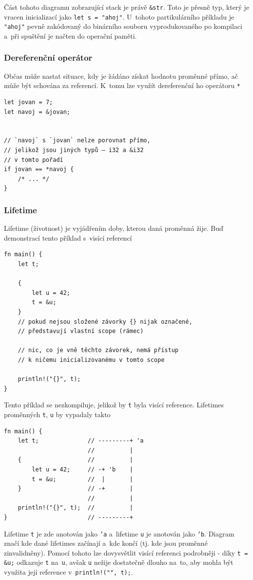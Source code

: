 \documentclass[a4paper, 12pt, twoside]{article} %
\newcommand{\rust}[1]{\texttt{#1}}
\begin{document}
				Část tohoto diagramu zobrazující stack je právě \rust{&str}. Toto je přesně typ, který je vracen inicializací jako \rust{let s = "ahoj"}. U~tohoto partikulárního příkladu je \rust{"ahoj"} pevně zakódovaný do binárního souboru vyprodukovaného po kompilaci a~při spuštění je načten do operační paměti.

			\subsubsection*{Dereferenční operátor}
				Občas může nastat situace, kdy je žádáno získat hodnotu proměnné přímo, ač může být schována za referencí. K~tomu lze využít dereferenční ho operátoru \rust{*}
				\begin{verbatim} 
let jovan = 7;
let navoj = &jovan;


// `navoj` s `jovan` nelze porovnat přímo,
// jelikož jsou jiných typů — i32 a &i32
// v tomto pořadí
if jovan == *navoj {
	/* ... */
}
				\end{verbatim}
		
			\subsubsection*{Lifetime}
				Lifetime (životnost) je vyjádřením doby, kterou daná proměnná žije. Buď demonstrací tento příklad s~visící referencí
				\begin{verbatim}
fn main() {
	let t;

	{
		let u = 42;
		t = &u;
	}
	// pokud nejsou složené závorky {} nijak označené,
	// představují vlastní scope (rámec)

	// nic, co je vně těchto závorek, nemá přístup
	// k ničemu inicializovanému v tomto scope

	println!("{}", t);
}
				\end{verbatim}
				
				Tento příklad se nezkompiluje, jelikož by \rust{t} byla visící reference. Lifetimes proměnných \rust{t}, \rust{u} by vypadaly takto
				\begin{verbatim}
fn main() {
	let t;              // ---------+ 'a
						//          |
	{                   //          |
		let u = 42;     // -+ 'b    |
		t = &u;         //  |       |
	}                   // -+       |
						//          |
	println!("{}", t);  //          |
}                       // ---------+
			\end{verbatim}
			
				Lifetime \rust{t} je zde anotován jako \rust{'a} a~lifetime \rust{u} je anotován jako \rust{'b}. Diagram značí kde dané lifetimes začínají a~kde končí (tj. kde jsou proměnné zinvalidněny). Pomocí tohoto lze dovysvětlit visící referenci podrobněji - díky \rust{t = &u;} odkazuje \rust{t} na~\rust{u}, avšak \rust{u} nežije dostatečně dlouho na~to, aby mohla být využita její reference v~\rust{println!("{}", t);}.
				
\end{document}
